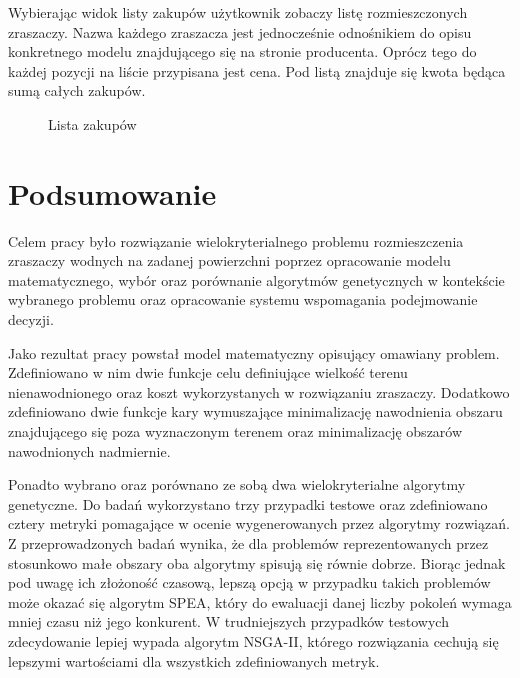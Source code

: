 \documentclass[twoside]{iisthesis}
\begin{document}
Wybierając widok listy zakupów użytkownik zobaczy listę rozmieszczonych zraszaczy. Nazwa każdego zraszacza jest jednocześnie odnośnikiem do opisu konkretnego modelu znajdującego się na stronie producenta. Oprócz tego do każdej pozycji na liście przypisana jest cena. Pod listą znajduje się kwota będąca sumą całych zakupów.
\begin{figure}[!htb]
	\centering
	\caption{Lista zakupów}
	\label{fig:gui_8}
\end{figure}
\chapter{Podsumowanie}
Celem pracy było rozwiązanie wielokryterialnego problemu rozmieszczenia zraszaczy wodnych na zadanej powierzchni poprzez opracowanie modelu matematycznego, wybór oraz porównanie algorytmów genetycznych w kontekście wybranego problemu oraz opracowanie systemu wspomagania podejmowanie decyzji.

Jako rezultat pracy powstał model matematyczny opisujący omawiany problem. Zdefiniowano w nim dwie funkcje celu definiujące wielkość terenu nienawodnionego oraz koszt wykorzystanych w rozwiązaniu zraszaczy. Dodatkowo zdefiniowano dwie funkcje kary wymuszające minimalizację nawodnienia obszaru znajdującego się poza wyznaczonym terenem oraz minimalizację obszarów nawodnionych nadmiernie.

Ponadto wybrano oraz porównano ze sobą dwa wielokryterialne algorytmy genetyczne. Do badań wykorzystano trzy przypadki testowe oraz zdefiniowano cztery metryki pomagające w ocenie wygenerowanych przez algorytmy rozwiązań. Z przeprowadzonych badań wynika, że dla problemów reprezentowanych przez stosunkowo małe obszary oba algorytmy spisują się równie dobrze. Biorąc jednak pod uwagę ich złożoność czasową, lepszą opcją w przypadku takich problemów może okazać się algorytm SPEA, który do ewaluacji danej liczby pokoleń wymaga mniej czasu niż jego konkurent. W trudniejszych przypadków testowych zdecydowanie lepiej wypada algorytm NSGA-II, którego rozwiązania cechują się lepszymi wartościami dla wszystkich zdefiniowanych metryk.
\end{document}
